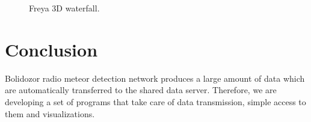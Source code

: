 \documentclass[10pt,a4paper,twoside,dvips]{article}
\begin{document}
\begin{IMCpaper}
\begin{figure}[htb]
\centering
{}
\caption{Freya 3D waterfall.}%
\label{RTBmmap}
\end{figure}

\section{Conclusion}
Bolidozor radio meteor detection network produces a large amount of data which are automatically transferred to the shared data server. Therefore, we are developing a set of programs that take care of data transmission, simple access to them and visualizations.  

                                                                                                                           
\nocite{*}



\end{IMCpaper}
\end{document}
